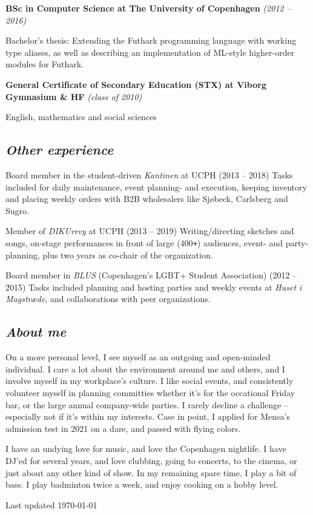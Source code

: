 \documentclass[10pt, a4paper]{article}
\begin{document}
\textbf{BSc in Computer Science at The University of Copenhagen} \textit{(2012 -- 2016)}
\begin{outline}
\1 Bachelor's thesis: Extending the Futhark programming language with working type aliases, as well as describing an implementation of ML-style higher-order modules for Futhark.
\end{outline}

\textbf{General Certificate of Secondary Education (STX) at Viborg Gymnasium \& HF} \textit{(class of 2010)}
\begin{outline}
\1 English, mathematics and social sciences
\end{outline}

\subsection*{\textit{Other experience}}
\begin{outline}
  \1 Board member in the student-driven \textit{Kantinen} at UCPH (2013 -- 2018)\newline
    {\footnotesize Tasks included for daily maintenance, event planning- and execution, keeping inventory and placing weekly orders with B2B wholesalers like Sjøbeck, Carlsberg and Sugro.}

  \1 Member of \textit{DIKUrevy} at UCPH (2013 -- 2019)\newline
    {\footnotesize Writing/directing sketches and songs, on-stage performances in front of large (400\texttt{+}) audiences, event- and party-planning, plus two years as co-chair of the organization.}

  \1 Board member in \textit{BLUS} (Copenhagen's LGBT+ Student Association)  (2012 -- 2015)\newline
    {\footnotesize Tasks included planning and hosting parties and weekly events at \textit{Huset i Magstræde}, and collaborations with peer organizations.}
\end{outline}
\vspace*{\fill}
\subsection*{\textit{About me}}
On a more personal level, I see myself as an outgoing and open-minded individual.
I care a lot about the environment around me and others, and I involve myself in my workplace's culture. I like social events, and consistently volunteer myself in planning committies whether it's for the occational Friday bar, or the large annual company-wide parties.
I rarely decline a challenge -- especially not if it's within my interests. Case in point, I applied for Mensa's admission test in 2021 on a dare, and passed with flying colors.

I have an undying love for music, and love the Copenhagen nightlife. I have DJ'ed for several years, and love clubbing, going to concerts, to the cinema, or just about any other kind of show.
In my remaining spare time, I play a bit of bass. I play badminton twice a week, and enjoy cooking on a hobby level.

\vspace*{\fill}
\begin{flushright}
  Last updated \today
\end{flushright}
\end{document}
